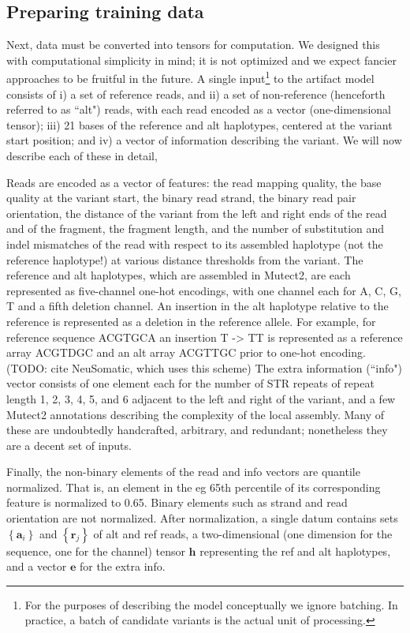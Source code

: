 \documentclass[times, twoside, watermark]{StyleBioRxiv}
\begin{document}
\subsection*{Preparing training data} 
Next, data must be converted into tensors for computation.  We designed this with computational simplicity in mind; it is not optimized and we expect fancier approaches to be fruitful in the future.  A single input\footnote{For the purposes of describing the model conceptually we ignore batching.  In practice, a batch of candidate variants is the actual unit of processing.} to the artifact model consists of i) a set of reference reads, and ii) a set of non-reference (henceforth referred to as ``alt") reads, with each read encoded as a vector (one-dimensional tensor); iii) 21 bases of the reference and alt haplotypes, centered at the variant start position; and iv) a vector of information describing the variant.  We will now describe each of these in detail,

Reads are encoded as a vector of features: the read mapping quality, the base quality at the variant start, the binary read strand, the binary read pair orientation, the distance of the variant from the left and right ends of the read and of the fragment, the fragment length, and the number of substitution and indel mismatches of the read with respect to its assembled haplotype (not the reference haplotype!) at various distance thresholds from the variant.  The reference and alt haplotypes, which are assembled in Mutect2, are each represented as five-channel one-hot encodings, with one channel each for A, C, G, T and a fifth deletion channel.  An insertion in the alt haplotype relative to the reference is represented as a deletion in the reference allele.  For example, for reference sequence ACGTGCA an insertion T -> TT  is represented as a reference array ACGTDGC and an alt array ACGTTGC prior to one-hot encoding.  (TODO: cite NeuSomatic, which uses this scheme)  The extra information (``info") vector consists of one element each for the number of STR repeats of repeat length 1, 2, 3, 4, 5, and 6 adjacent to the left and right of the variant, and a few Mutect2 annotations describing the complexity of the local assembly.  Many of these are undoubtedly handcrafted, arbitrary, and redundant; nonetheless they are a decent set of inputs.

Finally, the non-binary elements of the read and info vectors are quantile normalized.  That is, an element in the eg 65th percentile of its corresponding feature is normalized to 0.65.  Binary elements such as strand and read orientation are not normalized.  After normalization, a single datum contains sets $\left\{ \mathbf{a}_i \right\}$ and $\left\{ \mathbf{r}_j \right\}$ of alt and ref reads, a two-dimensional (one dimension for the sequence, one for the channel) tensor $\mathbf{h}$ representing the ref and alt haplotypes, and a vector $\mathbf{e}$ for the extra info.
\end{document}
